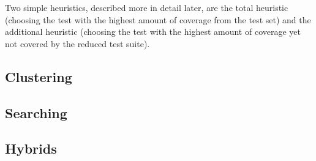 Two simple heuristics, described more in detail later, are the total
heuristic (choosing the test with the highest amount of coverage from
the test set) and the additional heuristic (choosing the test with the
highest amount of coverage yet not covered by the reduced test suite).

\subsection{Clustering}



\subsection{Searching}

\subsection{Hybrids}
